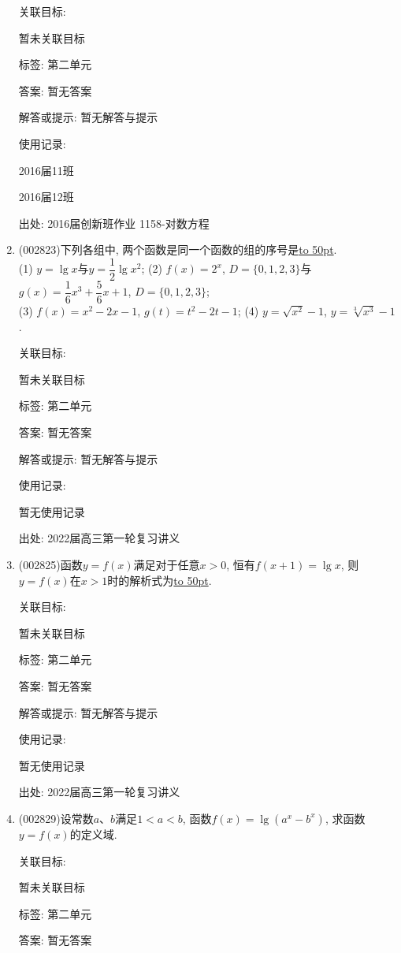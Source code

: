 \documentclass[10pt,a4paper]{article}
\newcommand{\blank}[1]{\underline{\hbox to #1pt{}}}
\begin{document}
\begin{enumerate}[1.]
关联目标:

暂未关联目标



标签: 第二单元

答案: 暂无答案

解答或提示: 暂无解答与提示

使用记录:

2016届11班	

2016届12班	


出处: 2016届创新班作业	1158-对数方程
\item { (002823)}下列各组中, 两个函数是同一个函数的组的序号是\blank{50}.\\
(1) $y=\lg x$与$y=\dfrac 12\lg {x^2}$; (2) $f(x)=2^x$, $D=\{0,1,2,3\}$与$g(x)=\dfrac 16{x^3}+\dfrac 56x+1$, $D=\{0,1,2,3\}$; \\
(3) $f(x)=x^2-2x-1$, $g(t)=t^2-2t-1$; (4) $y=\sqrt{x^2}-1$, $y=\sqrt[3]{x^3}-1$.


关联目标:

暂未关联目标



标签: 第二单元

答案: 暂无答案

解答或提示: 暂无解答与提示

使用记录:

暂无使用记录


出处: 2022届高三第一轮复习讲义
\item { (002825)}函数$y=f(x)$满足对于任意$x>0$, 恒有$f(x+1)=\lg x$, 则$y=f(x)$在$x>1$时的解析式为\blank{50}.


关联目标:

暂未关联目标



标签: 第二单元

答案: 暂无答案

解答或提示: 暂无解答与提示

使用记录:

暂无使用记录


出处: 2022届高三第一轮复习讲义
\item { (002829)}设常数$a$、$b$满足$1<a<b$, 函数$f(x)=\lg(a^x-b^x)$, 求函数$y=f(x)$的定义域.


关联目标:

暂未关联目标



标签: 第二单元

答案: 暂无答案


\end{enumerate}
\end{document}
